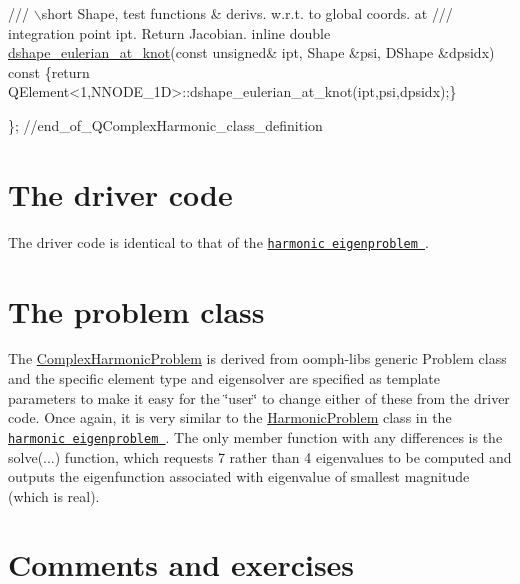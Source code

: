 \begin{DoxyCodeInclude}
\textcolor{comment}{}
\textcolor{comment}{ /// \(\backslash\)short Shape, test functions & derivs. w.r.t. to global coords. at}
\textcolor{comment}{ /// integration point ipt. Return Jacobian.}
\textcolor{comment}{} \textcolor{keyword}{inline} \textcolor{keywordtype}{double} \hyperlink{classQComplexHarmonicElement_a3f8d1d9396135d4d86f416dcf6c23904}{dshape\_eulerian\_at\_knot}(\textcolor{keyword}{const} \textcolor{keywordtype}{unsigned}& ipt,
                                       Shape &psi, 
                                       DShape &dpsidx)\textcolor{keyword}{ const}
\textcolor{keyword}{  }\{\textcolor{keywordflow}{return} QElement<1,NNODE\_1D>::dshape\_eulerian\_at\_knot(ipt,psi,dpsidx);\}

\}; \textcolor{comment}{//end\_of\_QComplexHarmonic\_class\_definition}

\end{DoxyCodeInclude}
\hypertarget{index_main}{}\section{The driver code}\label{index_main}
The driver code is identical to that of the \href{../../harmonic/html/index.html}{\tt harmonic eigenproblem }.



 

\hypertarget{index_problem}{}\section{The problem class}\label{index_problem}
The {\ttfamily \hyperlink{classComplexHarmonicProblem}{Complex\+Harmonic\+Problem}} is derived from {\ttfamily oomph-\/lib\textquotesingle{}s} generic {\ttfamily Problem} class and the specific element type and eigensolver are specified as template parameters to make it easy for the \char`\"{}user\char`\"{} to change either of these from the driver code. Once again, it is very similar to the {\ttfamily \hyperlink{classHarmonicProblem}{Harmonic\+Problem}} class in the \href{../../harmonic/html/index.html}{\tt harmonic eigenproblem }. The only member function with any differences is the {\ttfamily solve}(...) function, which requests 7 rather than 4 eigenvalues to be computed and outputs the eigenfunction associated with eigenvalue of smallest magnitude (which is real).



 

\hypertarget{index_exercises}{}\section{Comments and exercises}\label{index_exercises}

